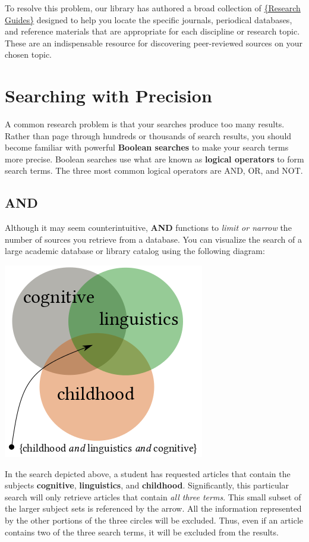 {To resolve this problem, our library has authored a broad collection of 
\href{http://www.bu.edu/library/research/guides/research-guides}{\{Research 
Guides\}} designed to help you locate the specific journals, periodical 
databases, and reference materials that are appropriate for each discipline or 
research topic. These are an indispensable resource for discovering 
peer-reviewed sources on your chosen topic. 

\section{Searching with Precision}

A common research problem is that your searches produce too many results. 
Rather than page through hundreds or thousands of search results, you should 
become familiar with powerful \textbf{Boolean searches} to make your search 
terms more precise. Boolean searches use what are known as \textbf{logical 
operators} to form search terms. The three most common logical operators are 
AND, OR, and NOT. 

\subsection{AND}

Although it may seem counterintuitive, \textbf{AND} functions to \emph{limit or 
narrow} the number of sources you retrieve from a database. You can visualize 
the search of a large academic database or library catalog using the following 
diagram:
 
\begin{center}
\includegraphics[width=.45\textwidth]{and3colors.png}
\end{center}

In the search depicted above, a student has requested articles that contain the 
subjects \textbf{cognitive}, \textbf{linguistics}, and \textbf{childhood}. 
Significantly, this particular search will only retrieve articles that contain 
\emph{all three terms}. This small subset of the larger subject sets is 
referenced by the arrow. All the information represented by the other portions 
of the three circles will be excluded. Thus, even if an article contains two of 
the three search terms, it will be excluded from the results.

}
